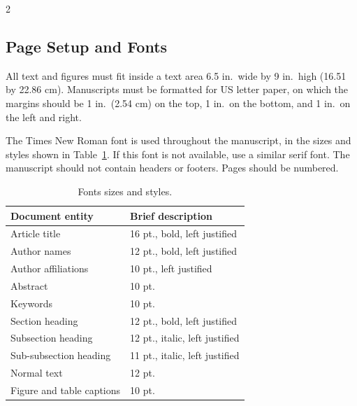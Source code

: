 \documentclass[12pt]{spieman}  %
\begin{document}
\begin{spacing}{2}
\subsection{Page Setup and Fonts}

All text and figures must fit inside a text area 6.5 in.\ wide by 9 in.\ high (16.51 by 22.86 cm). Manuscripts must be formatted for US letter paper, on which the margins should be 1 in.\ (2.54 cm) on the top, 1 in.\ on the bottom, and 1 in.\ on the left and right. 

The Times New Roman font is used throughout the manuscript, in the sizes and styles shown in Table~\ref{tab:fonts}. If this font is not available, use a similar serif font. The manuscript should not contain headers or footers. Pages should be numbered.

\begin{table}[ht]
\caption{Fonts sizes and styles.} 
\label{tab:fonts}
\begin{center}       
\begin{tabular}{|l|l|} %
\hline
\rule[-1ex]{0pt}{3.5ex}  Document entity & Brief description  \\
\hline\hline
\rule[-1ex]{0pt}{3.5ex}  Article title & 16 pt., bold, left justified  \\
\hline
\rule[-1ex]{0pt}{3.5ex}  Author names & 12 pt., bold, left justified   \\
\hline
\rule[-1ex]{0pt}{3.5ex}  Author affiliations & 10 pt., left justified   \\
\hline
\rule[-1ex]{0pt}{3.5ex}  Abstract & 10 pt.  \\
\hline
\rule[-1ex]{0pt}{3.5ex}  Keywords & 10 pt.  \\
\hline
\rule[-1ex]{0pt}{3.5ex}  Section heading & 12 pt., bold, left justified  \\
\hline
\rule[-1ex]{0pt}{3.5ex}  Subsection heading & 12 pt., italic, left justified  \\
\hline
\rule[-1ex]{0pt}{3.5ex}  Sub-subsection heading & 11 pt., italic, left justified  \\
\hline
\rule[-1ex]{0pt}{3.5ex}  Normal text & 12 pt. \\
\hline
\rule[-1ex]{0pt}{3.5ex}  Figure and table captions &  10 pt. \\
\hline 
\end{tabular}
\end{center}
\end{table} 


\end{spacing}
\end{document}
